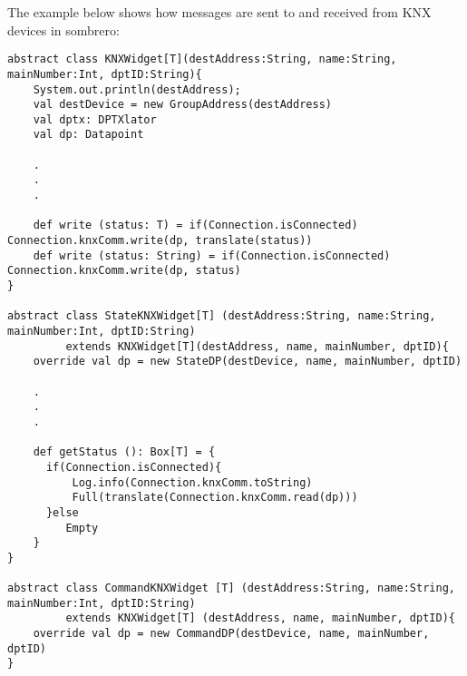 The example below shows how messages are sent to and received from KNX devices in sombrero:
\begin{lstlisting}[caption=Calimero write to device: Widget.scala,label=lst:calimero:write]
abstract class KNXWidget[T](destAddress:String, name:String, mainNumber:Int, dptID:String){
	System.out.println(destAddress);
    val destDevice = new GroupAddress(destAddress)
    val dptx: DPTXlator
    val dp: Datapoint

    .
    .
    .

	def write (status: T) = if(Connection.isConnected) Connection.knxComm.write(dp, translate(status))
	def write (status: String) = if(Connection.isConnected) Connection.knxComm.write(dp, status)
}

abstract class StateKNXWidget[T] (destAddress:String, name:String, mainNumber:Int, dptID:String)
		 extends KNXWidget[T](destAddress, name, mainNumber, dptID){
    override val dp = new StateDP(destDevice, name, mainNumber, dptID)

    .
    .
    .

	def getStatus (): Box[T] = {
	  if(Connection.isConnected){
		  Log.info(Connection.knxComm.toString)
		  Full(translate(Connection.knxComm.read(dp)))
	  }else
         Empty
	}
}

abstract class CommandKNXWidget [T] (destAddress:String, name:String, mainNumber:Int, dptID:String)
		 extends KNXWidget[T] (destAddress, name, mainNumber, dptID){
    override val dp = new CommandDP(destDevice, name, mainNumber, dptID)
}
\end{lstlisting} 